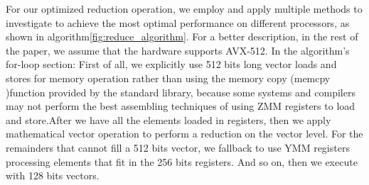 \documentclass[sigconf]{acmart}
\begin{document}
%
For our optimized reduction operation, we employ and apply multiple methods to investigate to achieve the
most optimal performance on different processors, as shown in algorithm\ref{fig:reduce_algorithm}.
For a better description, in the rest of the paper, we assume that the hardware supports AVX-512.
In the algorithm's for-loop section: First of all, we explicitly use 512 bits long vector loads and stores
for memory operation rather than using the memory copy (memcpy )function provided by
the standard library, because some systems and compilers
may not perform the best assembling techniques of using ZMM registers to load
and store.After we have all the elements loaded in registers, then we apply mathematical vector operation
to perform a reduction on the vector level.
For the remainders that cannot fill a 512 bits vector,
we fallback to use YMM registers processing elements that fit in the 256 bits registers.
And so on, then we execute with 128 bits vectors.
\end{document}
